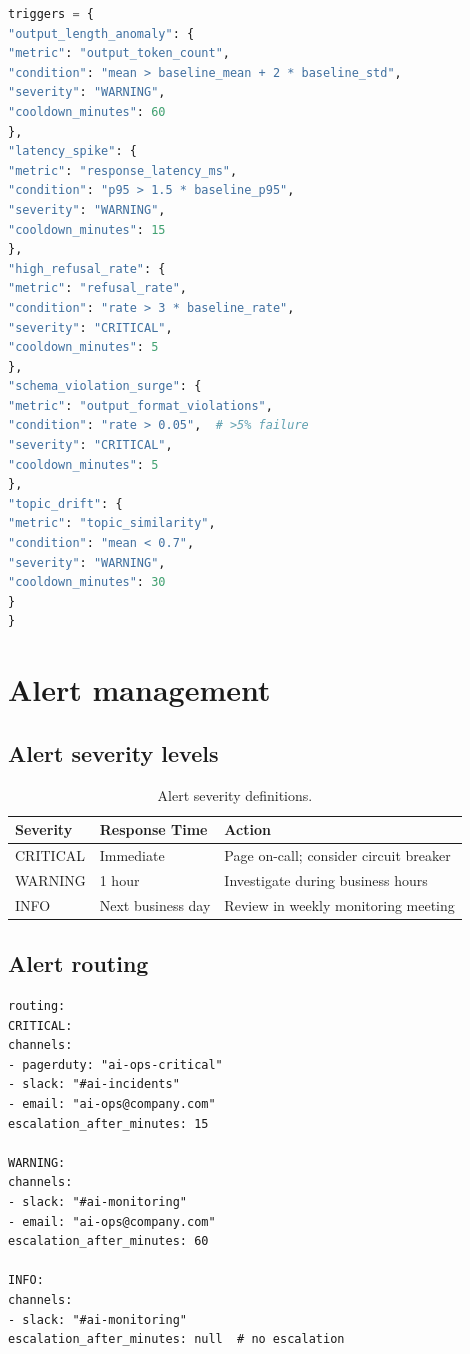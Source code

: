 \documentclass[11pt,a4paper,twoside]{report}
\begin{document}
\begin{lstlisting}[language=Python,basicstyle=\ttfamily\small,caption={Detection trigger configuration.}]
triggers = {
"output_length_anomaly": {
"metric": "output_token_count",
"condition": "mean > baseline_mean + 2 * baseline_std",
"severity": "WARNING",
"cooldown_minutes": 60
},
"latency_spike": {
"metric": "response_latency_ms",
"condition": "p95 > 1.5 * baseline_p95",
"severity": "WARNING",
"cooldown_minutes": 15
},
"high_refusal_rate": {
"metric": "refusal_rate",
"condition": "rate > 3 * baseline_rate",
"severity": "CRITICAL",
"cooldown_minutes": 5
},
"schema_violation_surge": {
"metric": "output_format_violations",
"condition": "rate > 0.05",  # >5% failure
"severity": "CRITICAL",
"cooldown_minutes": 5
},
"topic_drift": {
"metric": "topic_similarity",
"condition": "mean < 0.7",
"severity": "WARNING",
"cooldown_minutes": 30
}
}
\end{lstlisting}

\section{Alert management}

\subsection{Alert severity levels}

\begin{table}[htbp]
\centering
\caption{Alert severity definitions.}
\label{tab:alert-severity}
\footnotesize
\begin{tabularx}{\linewidth}{@{}l l X@{}}
\toprule
\textbf{Severity} & \textbf{Response Time} & \textbf{Action} \\ \midrule
CRITICAL & Immediate & Page on-call; consider circuit breaker \\
WARNING & 1 hour & Investigate during business hours \\
INFO & Next business day & Review in weekly monitoring meeting \\
\bottomrule
\end{tabularx}
\end{table}

\subsection{Alert routing}

\begin{lstlisting}[basicstyle=\ttfamily\small,caption={Alert routing configuration.}]
routing:
CRITICAL:
channels:
- pagerduty: "ai-ops-critical"
- slack: "#ai-incidents"
- email: "ai-ops@company.com"
escalation_after_minutes: 15

WARNING:
channels:
- slack: "#ai-monitoring"
- email: "ai-ops@company.com"
escalation_after_minutes: 60

INFO:
channels:
- slack: "#ai-monitoring"
escalation_after_minutes: null  # no escalation
\end{lstlisting}
\end{document}
